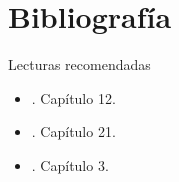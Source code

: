 \documentclass[9pt, aspectratio=169]{beamer}
\begin{document}


\section*{Bibliografía}
\begin{frame}[allowframebreaks]{Lecturas recomendadas}
\begin{itemize}
    \item {}. Capítulo 12.
\item {}. Capítulo 21.
    \item {}. Capítulo 3.
\end{itemize}
\end{frame}
\end{document}
